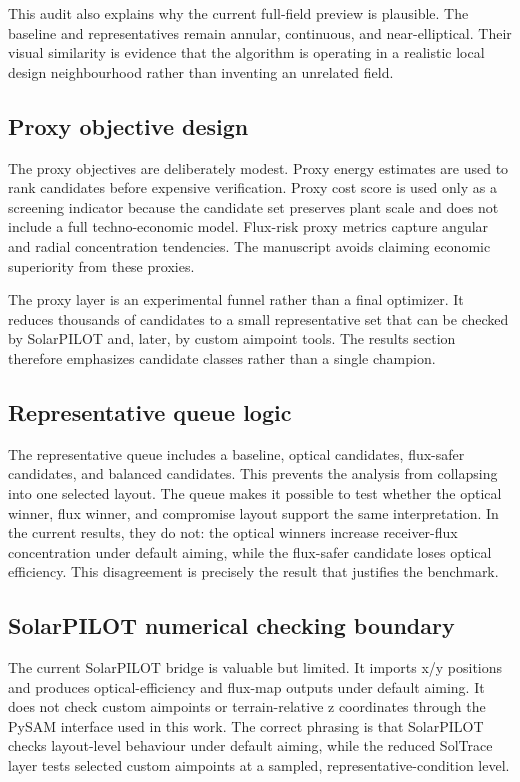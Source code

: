 \documentclass[final,3p,times]{elsarticle}
\begin{document}
This audit also explains why the current full-field preview is plausible. The baseline and representatives remain annular, continuous, and near-elliptical. Their visual similarity is evidence that the algorithm is operating in a realistic local design neighbourhood rather than inventing an unrelated field.

\subsection{Proxy objective design}
The proxy objectives are deliberately modest. Proxy energy estimates are used to rank candidates before expensive verification. Proxy cost score is used only as a screening indicator because the candidate set preserves plant scale and does not include a full techno-economic model. Flux-risk proxy metrics capture angular and radial concentration tendencies. The manuscript avoids claiming economic superiority from these proxies.

The proxy layer is an experimental funnel rather than a final optimizer. It reduces thousands of candidates to a small representative set that can be checked by SolarPILOT and, later, by custom aimpoint tools. The results section therefore emphasizes candidate classes rather than a single champion.

\subsection{Representative queue logic}
The representative queue includes a baseline, optical candidates, flux-safer candidates, and balanced candidates. This prevents the analysis from collapsing into one selected layout. The queue makes it possible to test whether the optical winner, flux winner, and compromise layout support the same interpretation. In the current results, they do not: the optical winners increase receiver-flux concentration under default aiming, while the flux-safer candidate loses optical efficiency. This disagreement is precisely the result that justifies the benchmark.

\subsection{SolarPILOT numerical checking boundary}
The current SolarPILOT bridge is valuable but limited. It imports x/y positions and produces optical-efficiency and flux-map outputs under default aiming. It does not check custom aimpoints or terrain-relative z coordinates through the PySAM interface used in this work. The correct phrasing is that SolarPILOT checks layout-level behaviour under default aiming, while the reduced SolTrace layer tests selected custom aimpoints at a sampled, representative-condition level.
\end{document}
